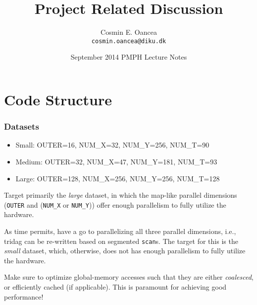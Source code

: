 \documentclass{beamer}
\title[Project]{Project Related Discussion}
\author[C.~Oancea]{Cosmin E. Oancea\\{\tt cosmin.oancea@diku.dk}}
\institute{Department of Computer Science (DIKU)\\University of Copenhagen}
\date[Sept 2014]{September 2014 PMPH Lecture Notes}
\begin{document}
\titleslide


\begin{frame}[fragile]
	\tableofcontents
\end{frame}


\section{Code Structure}

\begin{frame}[fragile,t]
  \frametitle{Datasets} %
\begin{itemize}
    \item{Small:} OUTER=16, NUM\_X=32, NUM\_Y=256, NUM\_T=90\medskip
    \item{Medium:} OUTER=32, NUM\_X=47, NUM\_Y=181, NUM\_T=93\medskip
    \item{Large:} OUTER=128, NUM\_X=256, NUM\_Y=256, NUM\_T=128
\end{itemize}\bigskip

\medskip 
Target primarily the {\em large} dataset, in which the map-like parallel 
dimensions ({\tt OUTER} and ({\tt NUM\_X} or {\tt NUM\_Y})) offer enough 
parallelism to fully utilize the hardware.

\medskip

As time permits, have a go to parallelizing all three parallel dimensions, 
i.e., {\sc tridag} can be re-written based on segmented {\tt scan}s.  
The target for this is the {\em small} dataset, which, otherwise, does not 
has enough parallelism to fully utilize the hardware.

\medskip

\alert{Make sure to optimize global-memory accesses such that they are either {\em coalesced},
or efficiently cached (if applicable). This is paramount for achieving good performance!}

\end{frame}
\end{document}
